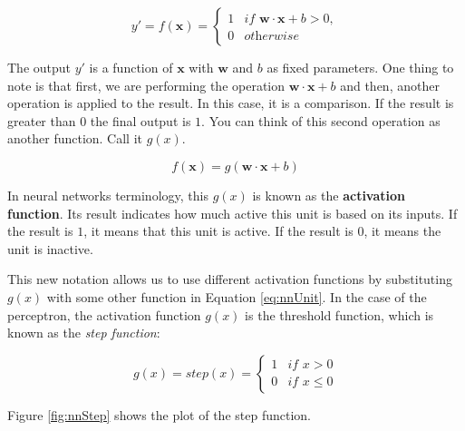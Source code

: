 \documentclass[
  11pt,
]{krantz}
\begin{document}
\begin{equation}
  y' = f(\boldsymbol{x}) =
 \begin{cases}
  1 & \textit{if } \boldsymbol{w} \cdot \boldsymbol{x} + b > 0, \\
  0 & \textit{otherwise}
 \end{cases}
\end{equation}

The output \(y'\) is a function of \(\boldsymbol{x}\) with \(\boldsymbol{w}\) and \(b\) as fixed parameters. One thing to note is that first, we are performing the operation \(\boldsymbol{w} \cdot \boldsymbol{x} + b\) and then, another operation is applied to the result. In this case, it is a comparison. If the result is greater than \(0\) the final output is \(1\). You can think of this second operation as another function. Call it \(g(x)\).

\begin{equation}
  f(\boldsymbol{x}) = g(\boldsymbol{w} \cdot \boldsymbol{x} + b)
  \label{eq:nnUnit}
\end{equation}

In neural networks terminology, this \(g(x)\) is known as the \textbf{activation function}. Its result indicates how much active this unit is based on its inputs. If the result is \(1\), it means that this unit is active. If the result is \(0\), it means the unit is inactive.

This new notation allows us to use different activation functions by substituting \(g(x)\) with some other function in Equation \eqref{eq:nnUnit}. In the case of the perceptron, the activation function \(g(x)\) is the threshold function, which is known as the \emph{step function}:

\begin{equation}
  g(x) = step(x) =
 \begin{cases}
  1 & \textit{if } x > 0 \\
  0 & \textit{if } x \leq 0
 \end{cases}
  \label{eq:stepfunc}
\end{equation}

Figure \ref{fig:nnStep} shows the plot of the step function.
\end{document}
